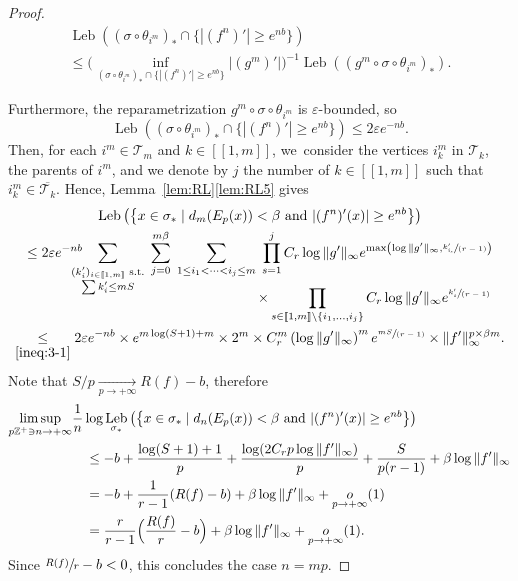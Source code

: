 \documentclass[JEP,XML,SOM,Unicode,NoFloatCountersInSection,published]{cedram}
\newcommand{\spfrac}[2]{\sfrac{#1}{(#2)}}
\DeclareMathOperator{\Leb}{Leb}
\theoremstyle{definition}
\newcommand{\bbZ}{{\mathbb{Z}}}
\begin{document}
\begin{proof}
\begin{minipage}{\textwidth}
\begin{multline*}
\Leb ((\sigma \circ \theta_{i^m})_* \cap \{ |(f^n)'| \geq e^{nb} \})\\
\leq \biggl (\inf_{(\sigma \circ \theta_{i^m})_* \cap \{ |(f^n)'| \geq e^{nb} \}} |(g^m)'|\biggr)^{-1} \Leb ((g^m \circ \sigma \circ \theta_{i^m})_*).
\end{multline*}
\end{minipage}
\par\smallskip\noindent
Furthermore, the reparametrization $g^m \circ \sigma \circ \theta_{i^m}$ is $\varepsilon$-bounded, so
\[
\Leb ((\sigma \circ \theta_{i^m})_* \cap \{ |(f^n)'| \geq e^{nb} \}) \leq 2 \varepsilon e^{-nb}.
\]
Then, for each $i^m \in \mathcal{T}_m$ and $k \in [\![ 1, m ]\!]$, we~consider the vertices $i^m_k$ in $\mathcal{T}_k$, \ie the parents of $i^m$, and we denote by $j$ the number of $k \in [\![ 1, m ]\!]$ such that $i_k^m \in \overline{\mathcal{T}_k}$. Hence,  Lemma~\ref{lem:RL}\eqref{lem:RL5} gives
\begin{multline*}
\Leb\left (\left \{ x \in \sigma_* \mid d_m(E_p(x)) < \beta \text{ and } | (f^n)'(x) | \geq e^{nb}\right \} \right)\\
\leq 2 \varepsilon e^{- nb} \hspace{-1em}\sum_{\substack{(k_i')_{i \in [\![ 1, m ]\!]} \text{ s.t.}\\
\sum k_i' \leq m S}} \; \sum_{j = 0}^{m \beta} \; \sum_{1 \leq i_1 < \cdots < i_j \leq m}\; \prod_{s=1}^j C_r \log \| g' \|_{\infty} e^{\max \left (\log \| g' \|_{\infty}, \spfrac{k_{i_s}'}{r-1} \right)}\\[-1em]
\shoveright{\times \prod_{s \in [\![ 1, m ]\!] \setminus \{ i_1,\dots, i_j \}} C_r \log \| g' \|_{\infty} e^{\spfrac{k_s'}{r-1}}}\\
\underset{\eqref{ineq:3-1}}{\leq} 2 \varepsilon e^{-nb} \times e^{m \log (S + 1) + m} \times 2^m \times C_r^m \left (\log \| g' \|_{\infty} \right)^m e^{\spfrac{m S}{r-1}} \times \| f' \|_{\infty}^{p \times \beta m}.
\end{multline*}
Note that $S/p \underset{p \to +\infty}{\longrightarrow} R(f) - b$, therefore
\begin{align*}
\limsup_{p \bbZ^+ \ni n \to +\infty} &\frac{1}{n} \log \Leb_{\sigma_*} \left (\left \{ x \in \sigma_* \mid d_n(E_p(x)) < \beta \text{ and } | (f^n)'(x) | \geq e^{nb} \right \} \right)\\
&\hspace{1em}\leq -b + \frac{\log(S+1) + 1}{p} + \frac{\log (2 C_r p \log \| f ' \|_{\infty})}{p}
+ \frac{S}{p(r-1)} + \beta \log \| f' \|_{\infty}\\
&\hspace{1em}= -b + \frac{1}{r-1}(R(f) - b) + \beta \log \| f' \|_{\infty} + \underset{p \to +\infty}{o}(1)\\
&\hspace{1em}=\frac{r}{r-1}\Bigl (\frac{R(f)}{r} - b \Bigr) + \beta \log \| f' \|_{\infty} + \underset{p \to +\infty}{o}(1).
\end{align*}
Since $\sfrac{R(f)}{r} - b < 0$, this concludes the case $n=mp$.


\end{proof}
\end{document}
